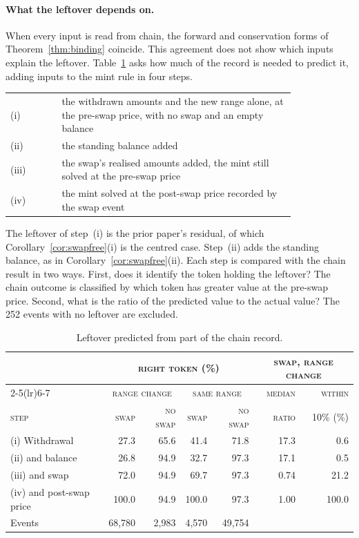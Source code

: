 \documentclass[11pt,a4paper]{article}
\DeclareRobustCommand{\thd}[1]{{\scshape\addfontfeatures{LetterSpace=1.5}\MakeLowercase{#1}}}
\theoremstyle{siphon}
\begin{document}
\paragraph{What the leftover depends on.}\label{sec:lift}
When every input is read from chain, the forward and conservation forms of Theorem~\ref{thm:binding} coincide. This agreement does not show which inputs explain the leftover. Table~\ref{tab:modelift} asks how much of the record is needed to predict it, adding inputs to the mint rule in four steps.
\begin{center}
\begin{tabular}{@{}l@{\quad}>{\raggedright\arraybackslash}p{0.82\linewidth}@{}}
(i) & the withdrawn amounts and the new range alone, at the pre-swap price, with no swap and an empty balance \\[1pt]
(ii) & the standing balance added \\[1pt]
(iii) & the swap's realised amounts added, the mint still solved at the pre-swap price \\[1pt]
(iv) & the mint solved at the post-swap price recorded by the swap event
\end{tabular}
\end{center}
The leftover of step~(i) is the prior paper's residual, of which Corollary~\ref{cor:swapfree}(i) is the centred case. Step~(ii) adds the standing balance, as in Corollary~\ref{cor:swapfree}(ii). Each step is compared with the chain result in two ways. First, does it identify the token holding the leftover? The chain outcome is classified by which token has greater value at the pre-swap price. Second, what is the ratio of the predicted value to the actual value? The 252 events with no leftover are excluded.

\begin{table}[!htb]
\centering
\caption{Leftover predicted from part of the chain record.}
\label{tab:modelift}
\begin{tabular}{@{}lrrrrrr@{}}
\toprule
 & \multicolumn{4}{c}{\thd{Right token (\%)}} & \multicolumn{2}{c}{\thd{Swap, range change}}  \\
\cmidrule(lr){2-5}\cmidrule(lr){6-7}
 & \multicolumn{2}{c}{\thd{Range change}} & \multicolumn{2}{c}{\thd{Same range}} & \thd{Median} & \thd{Within}  \\
\thd{Step} & \thd{Swap} & \thd{No swap} & \thd{Swap} & \thd{No swap} & \thd{ratio} & 10\% (\%)  \\
\midrule
(i) Withdrawal & 27.3 & 65.6 & 41.4 & 71.8 & 17.3 & 0.6 \\
(ii) and balance & 26.8 & 94.9 & 32.7 & 97.3 & 17.1 & 0.5 \\
(iii) and swap & 72.0 & 94.9 & 69.7 & 97.3 & 0.74 & 21.2 \\
(iv) and post-swap price & 100.0 & 94.9 & 100.0 & 97.3 & 1.00 & 100.0 \\
\midrule
Events & 68{,}780 & 2{,}983 & 4{,}570 & 49{,}754 & & \\
\bottomrule
\end{tabular}
\end{table}
\end{document}
